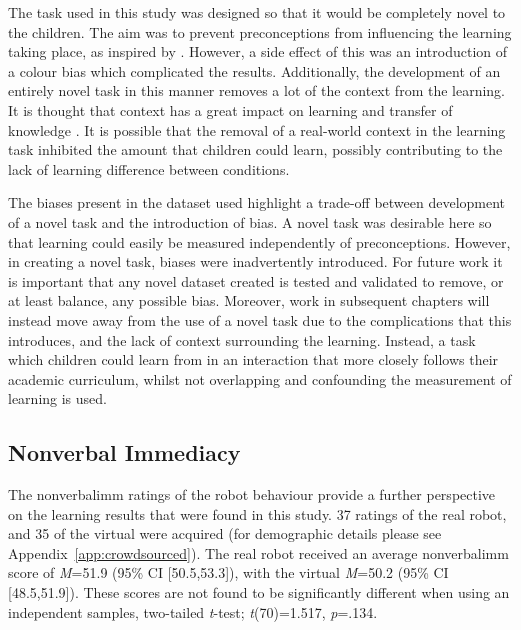 The task used in this study was designed so that it would be completely novel to the children. The aim was to prevent preconceptions from influencing the learning taking place, as inspired by \cite{lupyan2007language}. However, a side effect of this was an introduction of a colour bias which complicated the results. Additionally, the development of an entirely novel task in this manner removes a lot of the context from the learning. It is thought that context has a great impact on learning and transfer of knowledge \citep{tessmer1997role}. It is possible that the removal of a real-world context in the learning task inhibited the amount that children could learn, possibly contributing to the lack of learning difference between conditions.

The biases present in the dataset used highlight a trade-off between development of a novel task and the introduction of bias. A novel task was desirable here so that learning could easily be measured independently of preconceptions. However, in creating a novel task, biases were inadvertently introduced. For future work it is important that any novel dataset created is tested and validated to remove, or at least balance, any possible bias. Moreover, work in subsequent chapters will instead move away from the use of a novel task due to the complications that this introduces, and the lack of context surrounding the learning. Instead, a task which children could learn from in an interaction that more closely follows their academic curriculum, whilst not overlapping and confounding the measurement of learning is used.

\subsection{Nonverbal Immediacy}\label{sec:ch6-disc-nvi}
The \gls{nonverbalimm} ratings of the robot behaviour provide a further perspective on the learning results that were found in this study. 37 ratings of the real robot, and 35 of the virtual were acquired (for demographic details please see Appendix~\ref{app:crowdsourced}). The real robot received an average \gls{nonverbalimm} score of \textit{M}=51.9 (95\% CI [50.5,53.3]), with the virtual \textit{M}=50.2 (95\% CI [48.5,51.9]). These scores are not found to be significantly different when using an independent samples, two-tailed \textit{t}-test; \textit{t}(70)=1.517, \textit{p}=.134.

